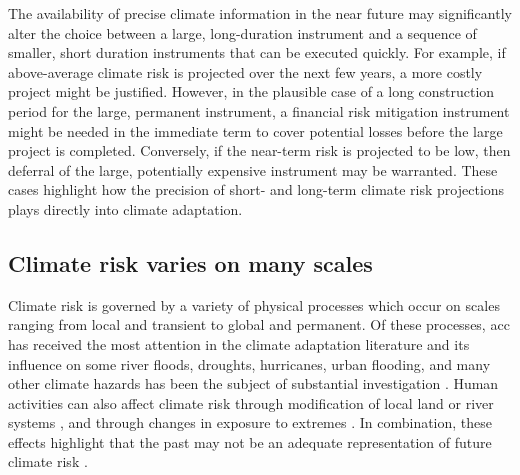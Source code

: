 \documentclass[
  draft,
  linenumbers
]{agujournal2019}
\begin{document}
The availability of precise climate information in the near future may significantly alter the choice between a large, long-duration instrument and a sequence of smaller, short duration instruments that can be executed quickly.
For example, if above-average climate risk is projected over the next few years, a more costly project might be justified.
However, in the plausible case of a long construction period for the large, permanent instrument, a financial risk mitigation instrument might be needed in the immediate term to cover potential losses before the large project is completed.
Conversely, if the near-term risk is projected to be low, then deferral of the large, potentially expensive instrument may be warranted.
These cases highlight how the precision of short- and long-term climate risk projections plays directly into climate adaptation.

\subsection{Climate risk varies on many scales}\label{sec:intro-lfv}

Climate risk is governed by a variety of physical processes which occur on scales ranging from local and transient to global and permanent.
Of these processes, \gls{acc} has received the most attention in the climate adaptation literature and its influence on some river floods, droughts, hurricanes, urban flooding, and many other climate hazards has been the subject of substantial investigation \citep[e.g.\@\xspace,][]{Coumou:2012bc,Milly:2008dg,OGorman:2009hj,Trenberth:2003bj}.
Human activities can also affect climate risk through modification of local land or river systems \citep[see][]{Merz:2014gf}, and through changes in exposure to extremes \citep{baldassarre:2018,Jongman:2012cr}.
In combination, these effects highlight that the past may not be an adequate representation of future climate risk \citep[termed ``nonstationarity'' by][]{Milly:2008dg}.
\end{document}
